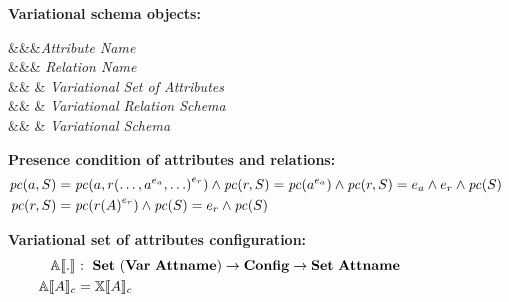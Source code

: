 \begin{figure}

\textbf{Variational schema objects:}
\begin{syntax}
\synDef \vAtt \attnametype &&&\textit{Attribute Name}\\
\synDef \vRel \relnametype &&& \textit{Relation Name}\\
\synDef \vAttList \vAttSet &\eqq& 
 & \textit{Variational Set of Attributes}\\
\synDef \vRelSch \vRelSchSet &\eqq& \vRelDef & \textit{Variational Relation Schema}\\
\synDef \vSch \vSchSet &\eqq& \vSchDef & \textit{Variational Schema}
\end{syntax}

\medskip
\textbf{Presence condition of attributes and relations:}
\begin{alignat*}{1}
\getPCfrom {\vAtt} {\vSch} &= \getPCfrom {\vAtt} {\vRel \annot [\dimMeta_\vRel] {(\ldots, \annot [\dimMeta_\vAtt] \vAtt, \ldots)}} \wedge \getPCfrom \vRel \vSch = \getPC {\annot [\dimMeta_\vAtt] \vAtt} \wedge \getPCfrom \vRel \vSch=
\dimMeta_\vAtt \wedge \dimMeta_\vRel \wedge \getPC \vSch\\
\getPCfrom {\vRel} \vSch &= \getPC {\vRel \annot [\dimMeta_\vRel] {(\vAttList)}} \wedge \getPC {\vSch} = \dimMeta_\vRel \wedge \getPC \vSch
\end{alignat*}

\medskip
\textbf{Variational set of attributes configuration:}
\begin{alignat*}{1}
 \olSem [] . &: \ \vAttSet \to \confSet \to \pAttSet\\
 \olSem \vAttList &= \elemSem \vAttList
 \end{alignat*}


\end{figure}
